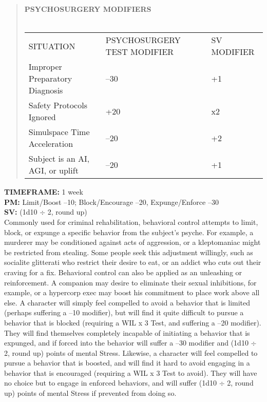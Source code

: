 \begin{quotation} \textbf{PSYCHOSURGERY MODIFIERS} \\ \\ \begin{tabular}{lll} SITUATION &PSYCHOSURGERY TEST MODIFIER &SV MODIFIER \\ Improper Preparatory Diagnosis &–30 &+1 \\ Safety Protocols Ignored &+20 &x2 \\ Simulspace Time Acceleration &–20 &+2 \\ Subject is an AI, AGI, or uplift &–20 &+1 \\ \end{tabular} \end{quotation} 

 \textbf{TIMEFRAME:} 1 week \\ \textbf{PM:} Limit/Boost –10; Block/Encourage –20, Expunge/Enforce –30 \\ \textbf{SV:} (1d10 $\div$ 2, round up) \\ Commonly used for criminal rehabilitation, behavioral control attempts to limit, block, or expunge a specific behavior from the subject’s psyche. For example, a murderer may be conditioned against acts of aggression, or a kleptomaniac might be restricted from stealing. Some people seek this adjustment willingly, such as socialite glitterati who restrict their desire to eat, or an addict who cuts out their craving for a fix. Behavioral control can also be applied as an unleashing or reinforcement. A companion may desire to eliminate their sexual inhibitions, for example, or a hypercorp exec may boost his commitment to place work above all else. A character will simply feel compelled to avoid a behavior that is limited (perhaps suffering a –10 modifier), but will find it quite difficult to pursue a behavior that is blocked (requiring a WIL x 3 Test, and suffering a –20 modifier). They will find themselves completely incapable of initiating a behavior that is expunged, and if forced into the behavior will suffer a –30 modifier and (1d10 $\div$ 2, round up) points of mental Stress. Likewise, a character will feel compelled to pursue a behavior that is boosted, and will find it hard to avoid engaging in a behavior that is encouraged (requiring a WIL x 3 Test to avoid). They will have no choice but to engage in enforced behaviors, and will suffer (1d10 $\div$ 2, round up) points of mental Stress if prevented from doing so. 


